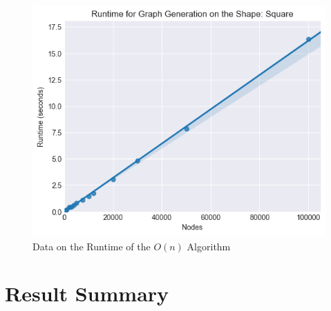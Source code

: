 \documentclass{article}
\begin{document}
  \begin{figure}[!htb]
    \centering
    \includegraphics[width=0.5 \textwidth]{square/runtime/runtime_chart}
    \caption{Data on the Runtime of the $O(n)$ Algorithm}
  \end{figure}

\section{Result Summary}
\end{document}
